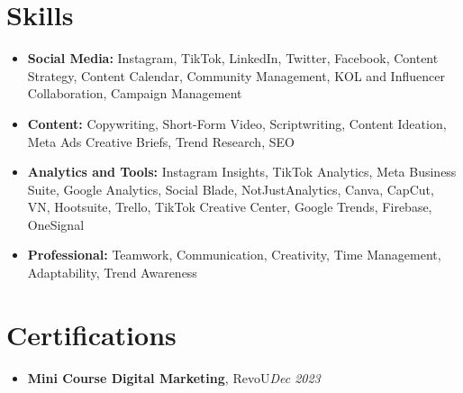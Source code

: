 \documentclass[10pt,letterpaper]{article}
\begin{document}
\section{Skills}
\begin{itemize}[label={},leftmargin=0pt,itemsep=1pt]\raggedright
\item \textbf{Social Media:} Instagram, TikTok, LinkedIn, Twitter, Facebook, Content Strategy, Content Calendar, Community Management, KOL and Influencer Collaboration, Campaign Management
\item \textbf{Content:} Copywriting, Short-Form Video, Scriptwriting, Content Ideation, Meta Ads Creative Briefs, Trend Research, SEO
\item \textbf{Analytics and Tools:} Instagram Insights, TikTok Analytics, Meta Business Suite, Google Analytics, Social Blade, NotJustAnalytics, Canva, CapCut, VN, Hootsuite, Trello, TikTok Creative Center, Google Trends, Firebase, OneSignal
\item \textbf{Professional:} Teamwork, Communication, Creativity, Time Management, Adaptability, Trend Awareness
\end{itemize}

\section{Certifications}
\begin{itemize}[label={},leftmargin=0pt]
\item \textbf{Mini Course Digital Marketing}, RevoU\hfill \textit{Dec 2023}
\end{itemize}
\end{document}
